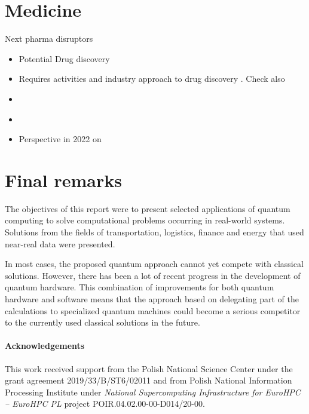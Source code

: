\documentclass[a4paper,11pt]{article}
\begin{document}
\section{Medicine}
%

Next pharma disruptors \cite{cova2021artificial}

\begin{itemize}
\item Potential Drug discovery \cite{cao2018potential}
\item Requires activities and industry approach to drug discovery \cite{zinner2022institutionalization}. Check also \cite{zinner2021quantum}
\item  \cite{floether2023state}
%
\item \cite{cordier2022biology}

\item Perspective in 2022 on \cite{blunt2022perspective}
\end{itemize}
\section{Final remarks}

The objectives of this report were to present selected applications of quantum computing to solve computational problems occurring in real-world systems. Solutions from the fields of transportation, logistics, finance and energy that used near-real data were presented.


In most cases, the proposed quantum approach cannot yet compete with classical solutions. However, there has been a lot of recent progress in the development of quantum hardware. This combination of improvements for both quantum hardware and software means that the approach based on delegating part of the calculations to specialized quantum machines could become a serious competitor to the currently used classical solutions in the future.



\paragraph{Acknowledgements}
This work received support from the Polish National Science Center under the grant agreement 2019/33/B/ST6/02011 and from Polish National Information Processing Institute  under \emph{National Supercomputing Infrastructure for EuroHPC -- EuroHPC PL} project POIR.04.02.00-00-D014/20-00.



\end{document}
